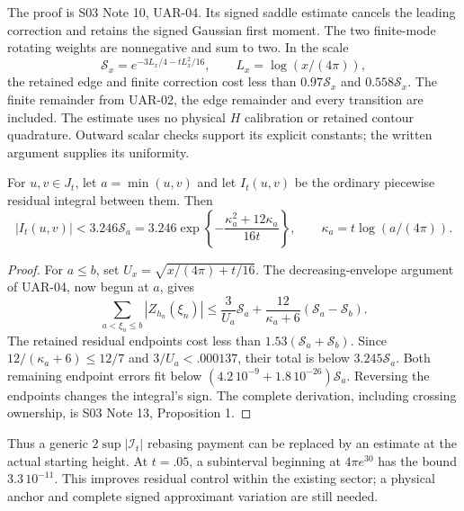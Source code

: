 The proof is
{S03 Note 10, UAR-04}. Its signed saddle estimate cancels the leading
correction and retains the signed Gaussian first moment. The two
finite-mode rotating weights are nonnegative and sum to two.
In the scale
\[
 \mathcal S_x=e^{-3L_x/4-tL_x^2/16},
 \qquad L_x=\log(x/(4\pi)),
\]
the retained edge and finite correction cost less than
$0.97\mathcal S_x$ and $0.558\mathcal S_x$.
The finite remainder from
{UAR-02}, the edge remainder and every transition are included.
The estimate uses no physical $H$ calibration or retained contour
quadrature. Outward scalar checks support its explicit constants;
the written argument supplies its uniformity.

\begin{corollary}
\label{cor:uar-rebased}
For $u,v\in J_t$, let $a=\min(u,v)$ and let $I_t(u,v)$ be the
ordinary piecewise residual integral between them. Then
\begin{equation}\label{eq:uar-rebased}
 |I_t(u,v)|<3.246\mathcal S_a
 =3.246\exp\left\{-\frac{\kappa_a^2+12\kappa_a}{16t}\right\},
 \qquad \kappa_a=t\log(a/(4\pi)).
\end{equation}
\end{corollary}
\begin{proof}
For $a\le b$, set $U_x=\sqrt{x/(4\pi)+t/16}$.
The decreasing-envelope argument of UAR-04, now begun at $a$, gives
\[
 \sum_{a<\xi_n\le b}|Z_{h_n}(\xi_n)|
 \le\frac3{U_a}\mathcal S_a+
 \frac{12}{\kappa_a+6}(\mathcal S_a-\mathcal S_b).
\]
The retained residual endpoints cost less than
$1.53(\mathcal S_a+\mathcal S_b)$. Since
$12/(\kappa_a+6)\le12/7$ and $3/U_a<.000137$,
their total is below $3.245\mathcal S_a$.
Both remaining endpoint errors fit below
$(4.2\,10^{-9}+1.8\,10^{-26})\mathcal S_a$.
Reversing the endpoints changes the integral's sign.
The complete derivation, including crossing ownership, is
{S03 Note 13, Proposition 1}.
\end{proof}

Thus a generic $2\sup|\mathcal I_t|$ rebasing payment can be replaced
by an estimate at the actual starting height. At $t=.05$, a subinterval
beginning at $4\pi e^{30}$ has the bound $3.3\,10^{-11}$.
This improves residual control within the existing sector; a physical
anchor and complete signed approximant variation are still needed.

